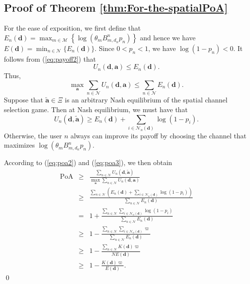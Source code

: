 \subsection{Proof of Theorem \ref{thm:For-the-spatialPoA}}\label{proofPoA}
For the ease of exposition, we first define that $E_{n}(\boldsymbol{d})=\max_{m\in\mathcal{M}}\left\{ \log\left(\theta_{m}B_{m,d_{n}}^{n}p_{n}\right)\right\} $
and hence we have $E(\boldsymbol{d})=\min_{n\in\mathcal{N}}\{E_{n}(\boldsymbol{d})\}$.
Since $0<p_{n}<1$, we have $\log(1-p_{n})<0$. It follows from (\ref{eq:payoff2})
that\begin{equation}
U_{n}(\boldsymbol{d},\boldsymbol{a})\leq E_{n}(\boldsymbol{d}).\label{eq:poa1}\end{equation}
Thus,\begin{equation}
\max_{\boldsymbol{a}}\sum_{n\in\mathcal{N}}U_{n}(\boldsymbol{d},\boldsymbol{a})\leq\sum_{n\in\mathcal{N}}E_{n}(\boldsymbol{d}).\label{eq:poa2}\end{equation}
Suppose that $\tilde{\boldsymbol{a}}\in\Xi$ is an arbitrary Nash
equilibrium of the spatial channel selection game. Then at Nash equilibrium,
we must have that\begin{equation}
U_{n}(\boldsymbol{d},\tilde{\boldsymbol{a}})\geq E_{n}(\boldsymbol{d})+\sum_{i\in\mathcal{N}_{n}(\boldsymbol{d})}\log(1-p_{i}).\label{eq:poa3}\end{equation}
Otherwise, the user $n$ always can improve its payoff by choosing
the channel that maximizes $\log\left(\theta_{m}B_{m,d_{n}}^{n}p_{n}\right)$.

According to (\ref{eq:poa2}) and (\ref{eq:poa3}), we then obtain\begin{eqnarray}
\mbox{PoA} & \geq & \frac{\sum_{n\in\mathcal{N}}U_{n}(\boldsymbol{d},\tilde{\boldsymbol{a}})}{\max_{\boldsymbol{a}}\sum_{n\in\mathcal{N}}U_{n}(\boldsymbol{d},\boldsymbol{a})}\nonumber \\
 & \geq & \frac{\sum_{n\in\mathcal{N}}\left(E_{n}(\boldsymbol{d})+\sum_{i\in\mathcal{N}_{n}(\boldsymbol{d})}\log(1-p_{i})\right)}{\sum_{n\in\mathcal{N}}E_{n}(\boldsymbol{d})}\nonumber \\
 & = & 1+\frac{\sum_{n\in\mathcal{N}}\sum_{i\in\mathcal{N}_{n}(\boldsymbol{d})}\log(1-p_{i})}{\sum_{n\in\mathcal{N}}E_{n}(\boldsymbol{d})}\nonumber \\
 & \geq & 1-\frac{\sum_{n\in\mathcal{N}}\sum_{i\in\mathcal{N}_{n}(\boldsymbol{d})}\varpi}{\sum_{n\in\mathcal{N}}E_{n}(\boldsymbol{d})}\nonumber \\
 & \geq & 1-\frac{\sum_{n\in\mathcal{N}}K(\boldsymbol{d})\varpi}{NE(\boldsymbol{d})}\nonumber \\
 & \geq & 1-\frac{K(\boldsymbol{d})\varpi}{E(\boldsymbol{d})}.\label{eq:PoA5}\end{eqnarray}
\qed

